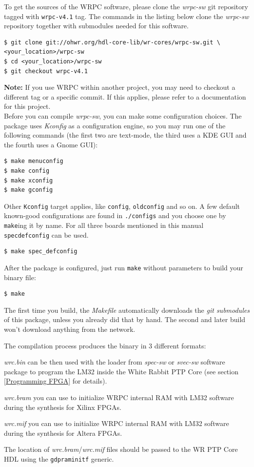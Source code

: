 \documentclass[a4paper, 12pt]{article}
\renewcommand{\_}{\underscore\allowbreak}
\newcommand{\code}[1]{\texttt{#1}}
\begin{document}
To get the sources of the WRPC software, please clone the \textit{wrpc-sw} git
repository tagged with \texttt{wrpc-v4.1} tag. The commands in the listing below
clone the \textit{wrpc-sw} repository together with submodules needed for this software.\\
\begin{lstlisting}
$ git clone git://ohwr.org/hdl-core-lib/wr-cores/wrpc-sw.git \
<your_location>/wrpc-sw
$ cd <your_location>/wrpc-sw
$ git checkout wrpc-v4.1
\end{lstlisting}

\textbf{Note:} If you use WRPC within another project, you may need to checkout
a different tag or a specific commit. If this applies, please refer to a
documentation for this project.\\

Before you can compile \textit{wrpc-sw}, you can make some configuration
choices. The package uses \textit{Kconfig} as a configuration engine, so you may
run one of the following commands (the first two are text-mode, the third uses
a KDE GUI and the fourth uses a Gnome GUI):
\begin{lstlisting}
$ make menuconfig
$ make config
$ make xconfig
$ make gconfig
\end{lstlisting}

Other \code{Kconfig} target applies, like \code{config}, \code{oldconfig}
and so on. A few default known-good configurations are found in
\texttt{./configs} and you choose one by \code{make}ing it by name. For all
three boards mentioned in this manual \code{spec\_defconfig} can be used.
\begin{lstlisting}
$ make spec_defconfig
\end{lstlisting}

After the package is configured, just run \code{make} without parameters to
build your binary file:
\begin{lstlisting}
$ make
\end{lstlisting}

The first time you build, the \textit{Makefile} automatically downloads
the \textit{git submodules} of this package, unless you already did that
by hand. The second and later build won't download anything
from the network.

The compilation process produces the binary in 3 different formats:
\begin{itemize*}
  \item \textit{wrc.bin} can be then used with the loader from \textit{spec-sw}
    or \textit{svec-sw} software package to program the LM32 inside the White
    Rabbit PTP Core (see section \ref{Programming FPGA} for details).
  \item \textit{wrc.bram} you can use to initialize WRPC internal RAM with LM32
    software during the synthesis for Xilinx FPGAs.
  \item \textit{wrc.mif} you can use to initialize WRPC internal RAM with LM32
    software during the synthesis for Altera FPGAs.
\end{itemize*}
The location of \textit{wrc.bram}/\textit{wrc.mif} files should be passed to the
WR PTP Core HDL using the \texttt{g\_dpram\_initf} generic.
\end{document}
